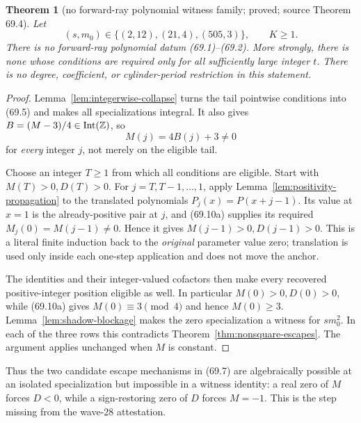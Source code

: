 \documentclass[10pt,reqno]{amsart}
\newtheorem{theorem}{Theorem}[section]
\theoremstyle{definition}
\newcommand{\1}{\mathbf 1}
\begin{document}
\begin{theorem}[no forward-ray polynomial witness family; proved; source Theorem 69.4]
\label{thm:forward-ray-obstruction}
Let
\begin{equation}\tag{69.10}
 (s,m_0)\in\{(2,12),(21,4),(505,3)\},\qquad K\geq1.
\end{equation}
There is no forward-ray polynomial datum (69.1)--(69.2).  More strongly,
there is none whose conditions are required only for all sufficiently large
integer $t$.  There is no degree, coefficient, or cylinder-period
restriction in this statement.
\end{theorem}
\begin{proof}
Lemma~\ref{lem:integerwise-collapse} turns the tail pointwise conditions into
(69.5) and makes all specializations integral.  It also gives
$B=(M-3)/4\in{\rm Int}(\mathbb Z)$, so
\begin{equation}\tag{69.10a}
                        M(j)=4B(j)+3\ne0
\end{equation}
for \emph{every} integer $j$, not merely on the eligible tail.

Choose an integer $T\geq1$ from which all conditions are eligible.  Start
with $M(T)>0,D(T)>0$.  For $j=T,T-1,\ldots,1$, apply
Lemma~\ref{lem:positivity-propagation} to the translated polynomials
$P_j(x)=P(x+j-1)$.  Its value at $x=1$ is the already-positive pair at $j$,
and (69.10a) supplies its required $M_j(0)=M(j-1)\ne0$.  Hence it gives
$M(j-1)>0,D(j-1)>0$.  This is a literal finite induction back to the
\emph{original} parameter value zero; translation is used only inside each
one-step application and does not move the anchor.

The identities and their integer-valued cofactors then make every recovered
positive-integer position eligible as well.  In particular
$M(0)>0,D(0)>0$, while (69.10a) gives $M(0)\equiv3\pmod4$ and hence
$M(0)\geq3$.  Lemma~\ref{lem:shadow-blockage} makes the zero specialization
a witness for $s m_0^2$.  In each of the three rows this contradicts
Theorem~\ref{thm:nonsquare-escapes}.  The argument applies unchanged when
$M$ is constant.
\end{proof}

Thus the two candidate escape mechanisms in (69.7) are algebraically
possible at an isolated specialization but impossible in a witness identity:
a real zero of $M$ forces $D<0$, while a sign-restoring zero of $D$ forces
$M=-1$.  This is the step missing from the wave-28 attestation.
\end{document}
